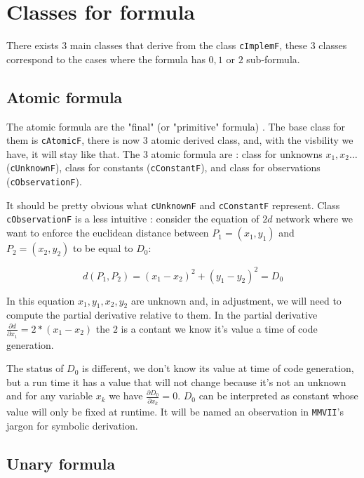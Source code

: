 \section{Classes for  formula}

There exists $3$ main classes that derive from the class {\tt cImplemF}, these $3$ classes
correspond to the cases where the formula has $0,1$ or $2$ sub-formula.

\subsection{Atomic formula}

The atomic formula are the "final" (or "primitive" formula) .  The base
class for them is {\tt cAtomicF}, there is now $3$ atomic derived class, and,
with the visbility we have,  it will stay like that. The $3$ atomic formula are : 
class for unknowns $x_1,x_2\dots$ ({\tt cUnknownF}), class for constants ({\tt cConstantF}),
and class for observations ({\tt cObservationF}).

It should be pretty obvious what {\tt cUnknownF}  and {\tt cConstantF} represent.
Class {\tt cObservationF} is a less intuitive : consider the equation of 
$2d$ network  where we want to enforce the euclidean distance between $P_1=(x_1,y_1)$ and $P_2=(x_2,y_2)$
to be equal to $D_0$:

\begin{equation}
   d(P_1,P_2) = (x_1-x_2)^2 + (y_1-y_2)^2 = D_0
\end{equation}

In this equation $x_1,y_1,x_2,y_2$ are unknown and, in adjustment, we will need to compute 
the partial derivative relative to them. In the partial derivative $\frac{\partial d}{\partial x_1} = 2*(x_1-x_2)$
the $2$ is a contant we know it's value a time of code generation.

The status of $D_0$ is different, we don't know its value at time of code generation, but a run time
it has a value that will not change because it's not an unknown and for 
any variable $x_k$  we have $\frac{\partial D_0}{\partial x_k} =0$.
$D_0$ can be interpreted as constant whose value will only be fixed at runtime. 
It will be named an observation in {\tt MMVII}'s jargon for symbolic derivation.



\subsection{Unary formula}

